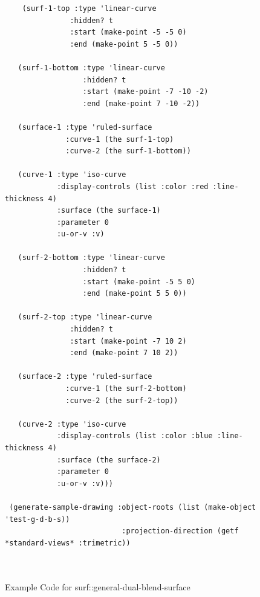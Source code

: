 \documentclass [11pt]{book}
\begin{document}
\begin{itemize}
\begin{figure}
\begin{lrbox}{\boxedverb}
\begin{minipage}{\linewidth}
{\begin{verbatim}
    (surf-1-top :type 'linear-curve
               :hidden? t
               :start (make-point -5 -5 0)
               :end (make-point 5 -5 0))
    
   (surf-1-bottom :type 'linear-curve
                  :hidden? t
                  :start (make-point -7 -10 -2)
                  :end (make-point 7 -10 -2))
    
   (surface-1 :type 'ruled-surface
              :curve-1 (the surf-1-top)
              :curve-2 (the surf-1-bottom))
    
   (curve-1 :type 'iso-curve
            :display-controls (list :color :red :line-thickness 4)
            :surface (the surface-1)
            :parameter 0
            :u-or-v :v)
    
   (surf-2-bottom :type 'linear-curve
                  :hidden? t
                  :start (make-point -5 5 0)
                  :end (make-point 5 5 0))
    
   (surf-2-top :type 'linear-curve
               :hidden? t
               :start (make-point -7 10 2)
               :end (make-point 7 10 2))
    
   (surface-2 :type 'ruled-surface
              :curve-1 (the surf-2-bottom)
              :curve-2 (the surf-2-top))
    
   (curve-2 :type 'iso-curve
            :display-controls (list :color :blue :line-thickness 4)
            :surface (the surface-2)
            :parameter 0
            :u-or-v :v)))

 (generate-sample-drawing :object-roots (list (make-object 'test-g-d-b-s))
                           :projection-direction (getf *standard-views* :trimetric))

 
\end{verbatim}}
\end{minipage}
\end{lrbox}
\fbox{\usebox{\boxedverb}}

\caption{Example Code for surf::general-dual-blend-surface}

\label{fig:example-code-surf::general-dual-blend-surface}

\end{figure}


\end{itemize}
\end{document}
